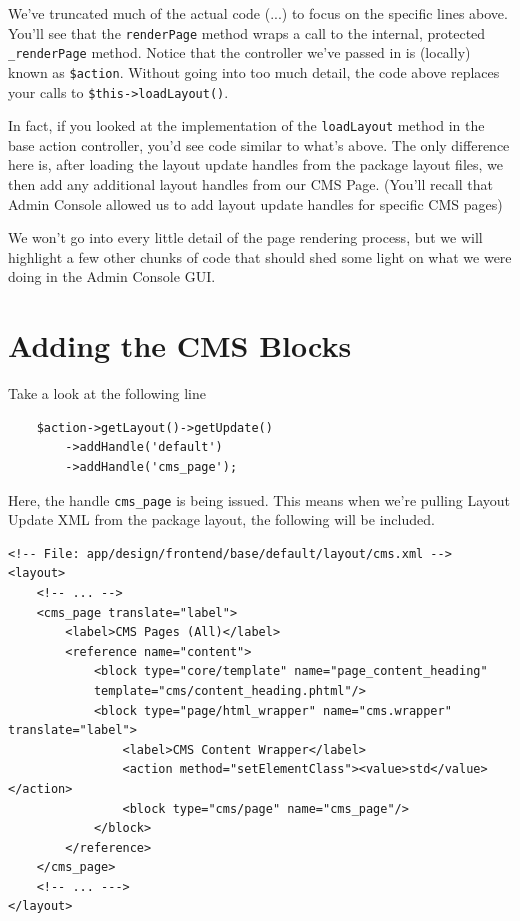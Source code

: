 \documentclass[oneside]{book}
\begin{document}
We've truncated much of the actual code (...) to focus on the specific lines above.  You'll see that the \footnotesize\texttt{renderPage} \normalsize  method wraps a call to the internal, protected \footnotesize\texttt{\_renderPage} \normalsize  method.  Notice that the controller we've passed in is (locally) known as \footnotesize\texttt{\$action}\normalsize.  Without going into too much detail, the code above replaces your calls to \footnotesize\texttt{\$this-\textgreater loadLayout()}\normalsize.  

In fact, if you looked at the implementation of the \footnotesize\texttt{loadLayout} \normalsize  method in the base action controller, you'd see code similar to what's above.  The only difference here is, after loading the layout update handles from the package layout files, we then add any additional layout handles from our CMS Page. (You'll recall that Admin Console allowed us to add layout update handles for specific CMS pages)

We won't go into every little detail of the page rendering process, but we will highlight a few other chunks of code that should shed some light on what we were doing in the Admin Console GUI.  

\section{Adding the CMS Blocks}

Take a look at the following line

\begin{lstlisting}
    $action->getLayout()->getUpdate()
        ->addHandle('default')
        ->addHandle('cms_page');

\end{lstlisting}


Here, the handle \footnotesize\texttt{cms\_page} \normalsize  is being issued.  This means when we're pulling Layout Update XML from the package layout, the following will be included.

\begin{lstlisting}
<!-- File: app/design/frontend/base/default/layout/cms.xml -->
<layout>
    <!-- ... -->
    <cms_page translate="label">
        <label>CMS Pages (All)</label>
        <reference name="content">
            <block type="core/template" name="page_content_heading"
            template="cms/content_heading.phtml"/>
            <block type="page/html_wrapper" name="cms.wrapper" translate="label">
                <label>CMS Content Wrapper</label>
                <action method="setElementClass"><value>std</value></action>
                <block type="cms/page" name="cms_page"/>
            </block>
        </reference>
    </cms_page>
    <!-- ... --->
</layout>

\end{lstlisting}
\end{document}
